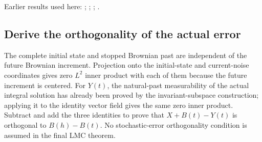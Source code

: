\documentclass[11pt,a4paper]{report}
\begin{document}
Earlier results used here: \cite[Section~3.25.1]{LangevinLean2026ULASC}; \cite[Section~3.25.4]{LangevinLean2026ULASC}; \cite[Section~3.11.1]{LangevinLean2026IPLA}; \cite[Section~3.18.4]{LangevinLean2026Proximal}.
\subsection{\texorpdfstring{Derive the orthogonality of the actual error}{Derive the orthogonality of the actual error}}
\label{report-step-AverageLMC-GaussianBrownian-lean-2}


The complete initial state and stopped Brownian past are independent of the future Brownian increment. Projection onto the initial-state and current-noise coordinates gives zero \(L^{2}\) inner product with each of them because the future increment is centered. For \(Y(t)\), the natural-past measurability of the actual integral solution has already been proved by the invariant-subspace construction; applying it to the identity vector field gives the same zero inner product. Subtract and add the three identities to prove that \(X+B(t)-Y(t)\) is orthogonal to \(B(h)-B(t)\). No stochastic-error orthogonality condition is assumed in the final LMC theorem.
\end{document}
